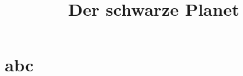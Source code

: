 \documentclass[a4paper,10pt]{book}
\title{Der schwarze Planet}
\begin{document}
\maketitle
\tableofcontents

\chapter{abc}
\end{document}
